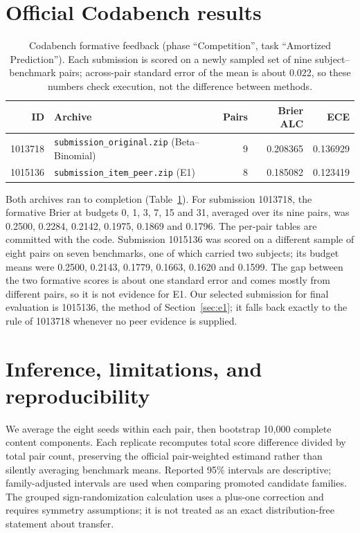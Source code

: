 \documentclass{article}
\newcommand{\CBEONE}{0.185082}
\newcommand{\CBPAIRS}{8}
\newcommand{\CBECE}{0.123419}
\begin{document}
\section{Official Codabench results}
\begin{table}[t]
\centering\small
\caption{Codabench formative feedback (phase ``Competition'', task
``Amortized Prediction''). Each submission is scored on a newly sampled set of
nine subject--benchmark pairs; across-pair standard error of the mean is about
0.022, so these numbers check execution, not the difference between methods.}
\label{tab:codabench}
\begin{tabular}{rlrrr}
\toprule
ID & Archive & Pairs & Brier ALC & ECE\\
\midrule
1013718 & \texttt{submission\_original.zip} (Beta--Binomial) & 9 & 0.208365 & 0.136929\\
1015136 & \texttt{submission\_item\_peer.zip} (E1) & \CBPAIRS{} & \CBEONE{} & \CBECE{}\\
\bottomrule
\end{tabular}
\end{table}
Both archives ran to completion (Table~\ref{tab:codabench}). For submission
1013718, the formative Brier at budgets 0, 1, 3, 7, 15 and 31, averaged over its
nine pairs, was 0.2500, 0.2284, 0.2142, 0.1975, 0.1869 and 0.1796. The
per-pair tables are committed with the code. Submission 1015136 was scored on a different sample of eight pairs on seven benchmarks, one of which carried two subjects; its budget means were 0.2500, 0.2143, 0.1779, 0.1663, 0.1620 and 0.1599. The gap between the two formative scores is about one standard error and comes mostly from different pairs, so it is not evidence for E1. Our selected submission for final
evaluation is 1015136, the method of Section~\ref{sec:e1}; it falls back exactly to the
rule of 1013718 whenever no peer evidence is supplied.

\section{Inference, limitations, and reproducibility}
We average the eight seeds within each pair, then bootstrap 10,000 complete
content components. Each replicate recomputes total score difference divided
by total pair count, preserving the official pair-weighted estimand rather
than silently averaging benchmark means. Reported 95\% intervals are
descriptive; family-adjusted intervals are used when comparing promoted
candidate families. The grouped sign-randomization calculation uses a
plus-one correction and requires symmetry assumptions; it is not treated
as an exact distribution-free statement about transfer.
\end{document}
